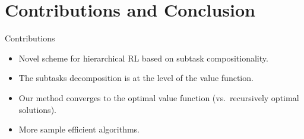 \documentclass{beamer}
\theoremstyle{mystyle}
\newcommand{\cS}{\mathcal{S}}
\begin{document}
\section{Contributions and Conclusion}
\begin{frame}{Contributions}
    \begin{itemize}
        \item Novel scheme for hierarchical RL based on subtask compositionality.
        \item The subtasks decomposition is at the level of the value function.
        \item Our method converges to the optimal value function (vs.~recursively optimal solutions).
        \item More sample efficient algorithms.

    \end{itemize}

\end{frame}

\begin{frame}{}
    
    
\end{frame}
\end{document}
